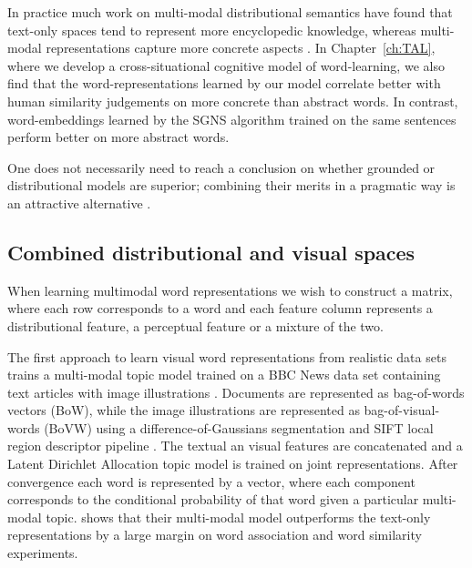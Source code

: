In practice much work on multi-modal distributional semantics have found that text-only spaces tend to
represent more encyclopedic knowledge, whereas multi-modal representations capture more concrete aspects
\citep{andrews2009integrating,baroni2008concepts}. In Chapter~\ref{ch:TAL}, where we develop
a cross-situational cognitive model of word-learning, we also find that the word-representations learned by
our model correlate better with human similarity judgements on more concrete than abstract words.
In contrast, word-embeddings learned by the SGNS algorithm trained on the same sentences
perform better on more abstract words.

One does not necessarily need to reach a conclusion on whether grounded or distributional
models are superior;  combining their merits in a
pragmatic way is an attractive alternative \citep{riordan2011redundancy}.


\subsection{Combined distributional and visual spaces}
\label{sec:distvis}

When learning multimodal word representations we wish to construct a matrix,
where each row corresponds to a word and each feature column
represents a distributional feature, a perceptual feature or a mixture of the two.

The first approach to learn visual word representations from realistic data sets
trains a multi-modal topic model trained on a
BBC News data set containing text articles with image illustrations \citep{feng2010visual}.
Documents are represented as bag-of-words vectors (BoW), while the
image illustrations are represented as bag-of-visual-words (BoVW)  \citep{csurka2004visual} using a
difference-of-Gaussians segmentation and
SIFT local region descriptor pipeline \citep{lowe1999object}.
The textual an visual features are concatenated and
a Latent Dirichlet Allocation \citep{blei2003latent} topic model is trained
on joint representations. After convergence each word is represented by a vector,
where each component corresponds to the conditional probability of that word given
a particular multi-modal topic. \cite{feng2010visual}
shows that their multi-modal model outperforms the text-only representations by a
large margin on word association and word similarity experiments.

